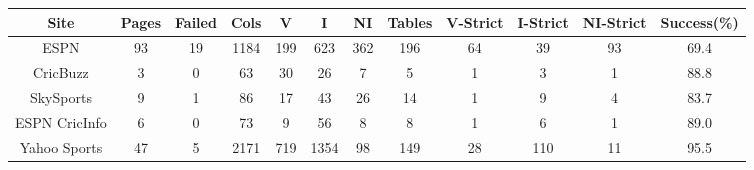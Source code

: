 \begin{table*}[hbtp]
\centering
\begin{tabular}{ |c|c|c|c|c|c|c|c|c|c|c|c| }
 \hline
 Site & Pages & Failed & Cols & V & I & NI & Tables & V-Strict & I-Strict & NI-Strict & Success(\%)\\
 \hline
 ESPN & 93 & 19 & 1184 & 199 & 623 & 362 & 196 & 64 & 39 & 93 & 69.4 \\
 \hline
 CricBuzz & 3 & 0 & 63 & 30 & 26 & 7 & 5 & 1 & 3 & 1 & 88.8\\
 \hline
 SkySports & 9 & 1 & 86 & 17 & 43 & 26 & 14 & 1 & 9 & 4 & 83.7 \\
 \hline
 ESPN CricInfo & 6 & 0 & 73 & 9 & 56 & 8 & 8 & 1 & 6 & 1 & 89.0 \\
 \hline
 Yahoo Sports & 47 & 5 & 2171 & 719 & 1354 & 98 & 149 & 28 & 110 & 11 & 95.5\\


\end{tabular}
\end{table*}
